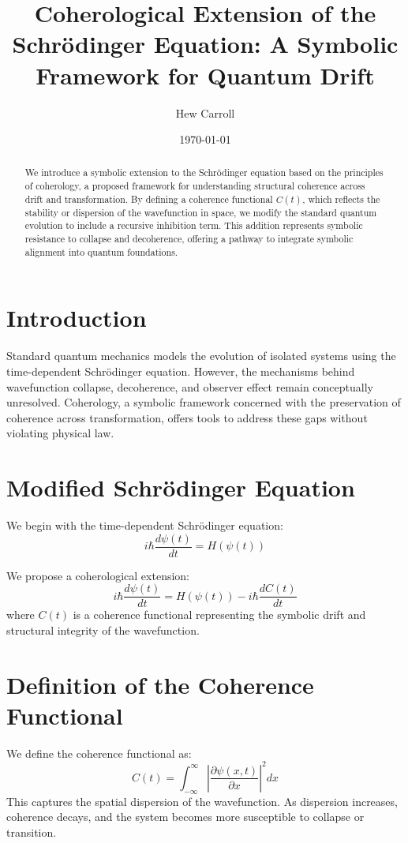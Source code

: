 \documentclass[12pt]{article}
\title{Coherological Extension of the Schrödinger Equation: A Symbolic Framework for Quantum Drift}
\author{Hew Carroll \\}
\date{\today}
\begin{document}
\maketitle

\begin{abstract}
We introduce a symbolic extension to the Schrödinger equation based on the principles of coherology, a proposed framework for understanding structural coherence across drift and transformation. By defining a coherence functional \( C(t) \), which reflects the stability or dispersion of the wavefunction in space, we modify the standard quantum evolution to include a recursive inhibition term. This addition represents symbolic resistance to collapse and decoherence, offering a pathway to integrate symbolic alignment into quantum foundations.
\end{abstract}

\section{Introduction}
Standard quantum mechanics models the evolution of isolated systems using the time-dependent Schrödinger equation. However, the mechanisms behind wavefunction collapse, decoherence, and observer effect remain conceptually unresolved. Coherology, a symbolic framework concerned with the preservation of coherence across transformation, offers tools to address these gaps without violating physical law.

\section{Modified Schrödinger Equation}
We begin with the time-dependent Schrödinger equation:
\begin{equation}
i\hbar \frac{d\psi(t)}{dt} = H(\psi(t))
\end{equation}

We propose a coherological extension:
\begin{equation}
i\hbar \frac{d\psi(t)}{dt} = H(\psi(t)) - i\hbar \frac{dC(t)}{dt}
\end{equation}
where \( C(t) \) is a coherence functional representing the symbolic drift and structural integrity of the wavefunction.

\section{Definition of the Coherence Functional}
We define the coherence functional as:
\begin{equation}
C(t) = \int_{-\infty}^{\infty} \left| \frac{\partial \psi(x,t)}{\partial x} \right|^2 dx
\end{equation}
This captures the spatial dispersion of the wavefunction. As dispersion increases, coherence decays, and the system becomes more susceptible to collapse or transition.
\end{document}
